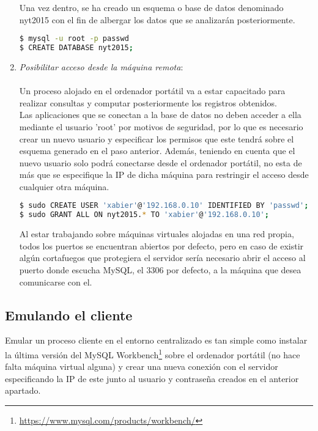 \begin{enumerate}
Una vez dentro, se ha creado un esquema o base de datos denominado nyt2015 con el fin de albergar los datos que se analizarán posteriormente.\\

\begin{lstlisting}[language=bash]
$ mysql -u root -p passwd
$ CREATE DATABASE nyt2015;
\end{lstlisting}

\item \textit{Posibilitar acceso desde la máquina remota}:\\\\ Un proceso alojado en el ordenador portátil va a estar capacitado para realizar consultas y computar posteriormente los registros obtenidos.\\

Las aplicaciones que se conectan a la base de datos no deben acceder a ella mediante el usuario 'root' por motivos de seguridad, por lo que es necesario crear un nuevo usuario y especificar los permisos que este tendrá sobre el esquema generado en el paso anterior. Además, teniendo en cuenta que el nuevo usuario solo podrá conectarse desde el ordenador portátil, no esta de más que se especifique la IP de dicha máquina para restringir el acceso desde cualquier otra máquina.\\

\begin{lstlisting}[language=bash]
$ sudo CREATE USER 'xabier'@'192.168.0.10' IDENTIFIED BY 'passwd';
$ sudo GRANT ALL ON nyt2015.* TO 'xabier'@'192.168.0.10';
\end{lstlisting}

Al estar trabajando sobre máquinas virtuales alojadas en una red propia, todos los puertos se encuentran abiertos por defecto, pero en caso de existir algún cortafuegos que protegiera el servidor sería necesario abrir el acceso al puerto donde escucha MySQL, el 3306 por defecto, a la máquina que desea comunicarse con el.\\ 

\end{enumerate}

\subsection{Emulando el cliente}

Emular un proceso cliente en el entorno centralizado es tan simple como instalar la última versión del MySQL Workbench\footnote{\url{https://www.mysql.com/products/workbench/}} sobre el ordenador portátil (no hace falta máquina virtual alguna) y crear una nueva conexión con el servidor especificando la IP de este junto al usuario y contraseña creados en el anterior apartado.\\

